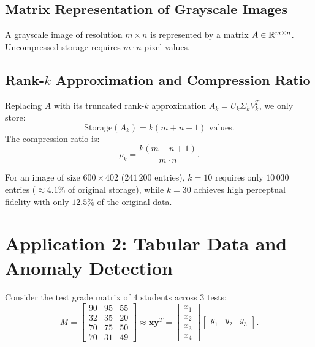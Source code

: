 \subsection{Matrix Representation of Grayscale Images}

A grayscale image of resolution $m \times n$ is represented by a matrix $A \in \mathbb{R}^{m \times n}$. Uncompressed storage requires $m \cdot n$ pixel values.

\subsection{Rank-$k$ Approximation and Compression Ratio}

Replacing $A$ with its truncated rank-$k$ approximation $A_k = U_k \Sigma_k V_k^T$, we only store:
\begin{equation}
    \text{Storage}(A_k) = k(m + n + 1) \text{ values}.
\end{equation}
The compression ratio is:
\begin{equation}
    \rho_k = \frac{k(m + n + 1)}{m \cdot n}.
\end{equation}

For an image of size $600 \times 402$ ($241\,200$ entries), $k = 10$ requires only $10\,030$ entries ($\approx 4.1\%$ of original storage), while $k = 30$ achieves high perceptual fidelity with only $12.5\%$ of the original data.

\FloatBarrier
\section{Application 2: Tabular Data and Anomaly Detection}
\label{sec:application-tabular-anomalies-en}

Consider the test grade matrix of $4$ students across $3$ tests:
\begin{equation}
    M = \begin{bmatrix}
        90 & 95 & 55 \\
        32 & 35 & 20 \\
        70 & 75 & 50 \\
        70 & 31 & 49
    \end{bmatrix} \approx \mathbf{x} \mathbf{y}^T = \begin{bmatrix} x_1 \\ x_2 \\ x_3 \\ x_4 \end{bmatrix} \begin{bmatrix} y_1 & y_2 & y_3 \end{bmatrix}.
\end{equation}

